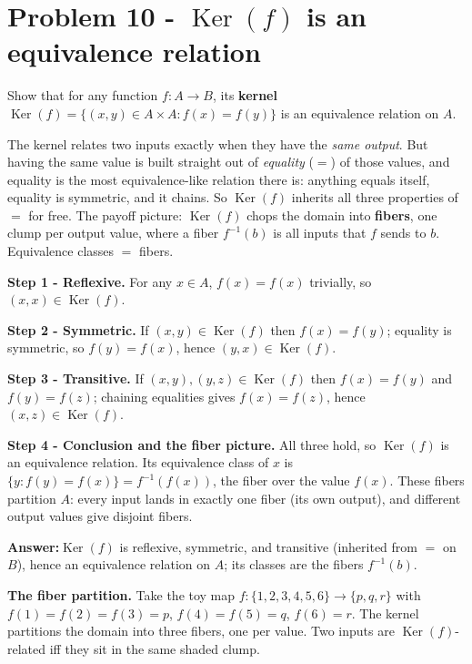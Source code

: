 \documentclass[11pt,a4paper]{article}
\DeclareMathOperator{\Ker}{Ker}
\newcommand{\answer}[1]{\begin{answerbox}\centering\textbf{Answer:}\quad #1\end{answerbox}}
\begin{document}
\section*{Problem 10 - $\Ker(f)$ is an equivalence relation}

\begin{problembox}[10]
Show that for any function $f:A\to B$, its \textbf{kernel}
$\Ker(f)=\{(x,y)\in A\times A: f(x)=f(y)\}$ is an equivalence relation on $A$.
\end{problembox}

\begin{ideabox}
The kernel relates two inputs exactly when they have the \emph{same output}. But \textquotedbl{}having
the same value\textquotedbl{} is built straight out of \emph{equality} ($=$) of those values, and
equality is the most equivalence-like relation there is: anything equals itself, equality is
symmetric, and it chains. So $\Ker(f)$ inherits all three properties of $=$ for free. The payoff
picture: $\Ker(f)$ chops the domain into \textbf{fibers}, one clump per output value, where a fiber
$f^{-1}(b)$ is all inputs that $f$ sends to $b$. Equivalence classes $=$ fibers.
\end{ideabox}

\textbf{Step 1 - Reflexive.} For any $x\in A$, $f(x)=f(x)$ trivially, so $(x,x)\in\Ker(f)$.

\textbf{Step 2 - Symmetric.} If $(x,y)\in\Ker(f)$ then $f(x)=f(y)$; equality is symmetric, so
$f(y)=f(x)$, hence $(y,x)\in\Ker(f)$.

\textbf{Step 3 - Transitive.} If $(x,y),(y,z)\in\Ker(f)$ then $f(x)=f(y)$ and $f(y)=f(z)$; chaining
equalities gives $f(x)=f(z)$, hence $(x,z)\in\Ker(f)$.

\textbf{Step 4 - Conclusion and the fiber picture.} All three hold, so $\Ker(f)$ is an equivalence
relation. Its equivalence class of $x$ is $\{y:f(y)=f(x)\}=f^{-1}(f(x))$, the fiber over the value
$f(x)$. These fibers partition $A$: every input lands in exactly one fiber (its own output), and
different output values give disjoint fibers.

\answer{$\Ker(f)$ is reflexive, symmetric, and transitive (inherited from $=$ on $B$), hence an
equivalence relation on $A$; its classes are the fibers $f^{-1}(b)$.}

\medskip
\textbf{The fiber partition.} Take the toy map $f:\{1,2,3,4,5,6\}\to\{p,q,r\}$ with
$f(1)=f(2)=f(3)=p$, $f(4)=f(5)=q$, $f(6)=r$. The kernel partitions the domain into three fibers,
one per value. Two inputs are $\Ker(f)$-related iff they sit in the same shaded clump.
\end{document}
